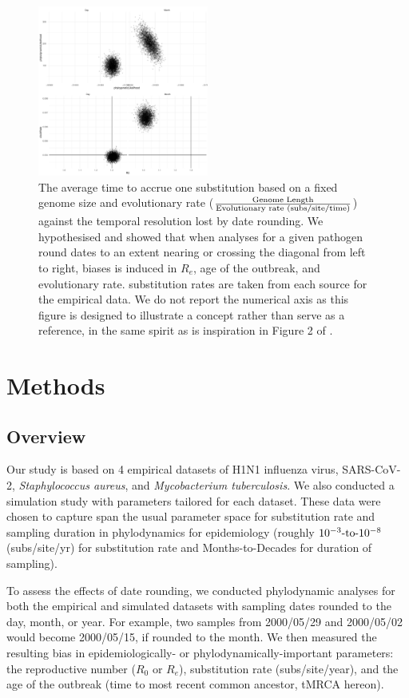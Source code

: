 \documentclass[11pt]{article}
\begin{document}
\begin{spacing}{1.5}
\begin{figure}[H]
    \centering
    \includegraphics[width = 0.5\textwidth]{plane.pdf}
    \caption{The average time to accrue one substitution based on a fixed genome size and evolutionary rate ($\frac{\textnormal{Genome Length}}{\textnormal{Evolutionary rate (subs/site/time)}}$) against the temporal resolution lost by date rounding. We hypothesised and showed that when analyses for a given pathogen round dates to an extent nearing or crossing the diagonal from left to right, biases is induced in $R_e$, age of the outbreak, and evolutionary rate. substitution rates are taken from each source for the empirical data. We do not report the numerical axis as this figure is designed to illustrate a concept rather than serve as a reference, in the same spirit as is inspiration in Figure 2 of \citet{biek_measurably_2015}.}
    \label{fig:plane}
\end{figure}


\section*{Methods}
\subsection*{Overview}
Our study is based on 4 empirical datasets of H1N1 influenza virus, SARS-CoV-2, \textit{Staphylococcus aureus}, and \textit{Mycobacterium tuberculosis}. We also conducted a  simulation study with parameters tailored for each dataset. These data were chosen to capture span the usual parameter space for substitution rate and sampling duration in phylodynamics for epidemiology (roughly $10^{-3}\textnormal{-to-}10^{-8}$ (subs/site/yr) for substitution rate and Months-to-Decades for duration of sampling).

To assess the effects of date rounding, we conducted phylodynamic analyses for both the empirical and simulated datasets with sampling dates rounded to the day, month, or year. For example, two samples from 2000/05/29 and 2000/05/02 would become 2000/05/15, if rounded to the month. We then measured the resulting bias in epidemiologically- or phylodynamically-important parameters: the reproductive number ($R_0$ or $R_e$), substitution rate (subs/site/year), and the age of the outbreak (time to most recent common ancestor, tMRCA hereon). 


\end{spacing}
\end{document}
